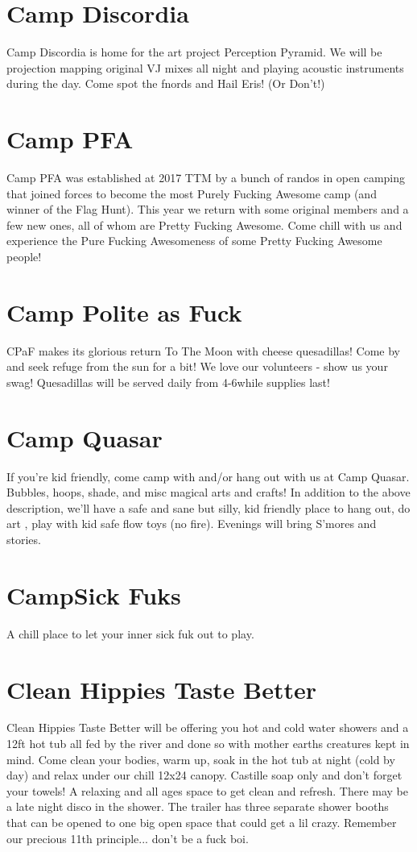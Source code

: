\begin{multicols}{2}
\section*{Camp Discordia}
Camp Discordia is home for the art project Perception Pyramid. We will be projection mapping original VJ mixes all night and playing acoustic instruments during the day. Come spot the fnords and Hail Eris! (Or Don't!)


\section*{Camp PFA}
Camp PFA was established at 2017 TTM by a bunch of randos in open camping that joined forces to become the most Purely Fucking Awesome camp (and winner of the Flag Hunt). This year we return with some original members and a few new ones, all of whom are Pretty Fucking Awesome. Come chill with us and experience the Pure Fucking Awesomeness of some Pretty Fucking Awesome people!


\section*{Camp Polite as Fuck}
CPaF makes its glorious return To The Moon with cheese quesadillas! Come by and seek refuge from the sun for a bit! We love our volunteers - show us your swag! Quesadillas will be served daily from 4-6\pm while supplies last!


\section*{Camp Quasar}
If you're kid friendly, come camp with and/or hang out with us at Camp Quasar. Bubbles, hoops, shade, and misc magical arts and crafts! In addition to the above description, we'll have a safe and sane but silly, kid friendly place to hang out, do art , play with kid safe flow toys (no fire). Evenings will bring S'mores and stories. 


\section*{CampSick Fuks}
A chill place to let your inner sick fuk out to play.


\section*{Clean Hippies Taste Better}
Clean Hippies Taste Better will be offering you hot and cold water showers and a 12ft hot tub all fed by the river and done so with mother earths creatures kept in mind. Come clean your bodies, warm up, soak in the hot tub at night (cold by day) and relax under our chill 12x24 canopy. Castille soap only and don’t forget your towels! A relaxing and all ages space to get clean and refresh. There may be a late night disco in the shower. The trailer has three separate shower booths that can be opened to one big open space that could get a lil crazy. Remember our precious 11th principle... don’t be a fuck boi. 



\end{multicols}
